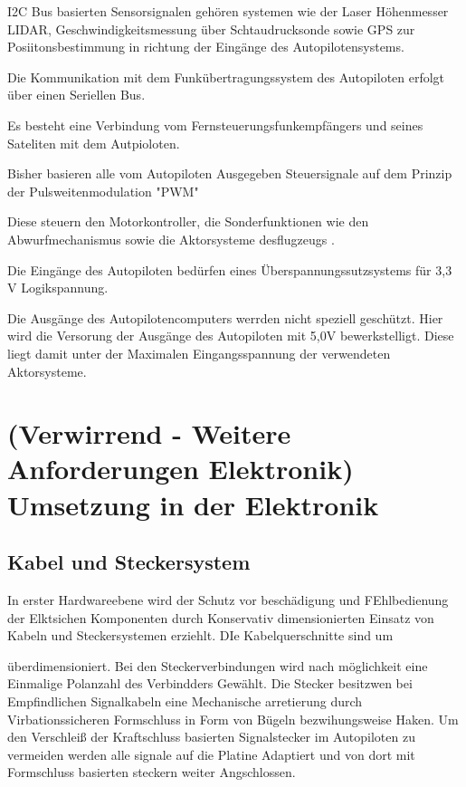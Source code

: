 I2C  Bus basierten Sensorsignalen gehören systemen wie der Laser Höhenmesser LIDAR, Geschwindigkeitsmessung über Schtaudrucksonde sowie GPS zur Posiitonsbestimmung in richtung der Eingänge des Autopilotensystems.

Die Kommunikation mit dem Funkübertragungssystem des Autopiloten erfolgt über einen Seriellen Bus.

Es besteht eine Verbindung vom Fernsteuerungsfunkempfängers und seines Sateliten mit dem Autpioloten.

Bisher basieren alle vom Autopiloten Ausgegeben Steuersignale auf dem Prinzip der Pulsweitenmodulation "PWM"

Diese steuern den Motorkontroller, die Sonderfunktionen wie den Abwurfmechanismus sowie die Aktorsysteme desflugzeugs .


Die Eingänge des Autopiloten bedürfen eines Überspannungssutzsystems für 3,3 V Logikspannung.

Die Ausgänge des Autopilotencomputers werrden nicht speziell geschützt. Hier wird die Versorung der Ausgänge des Autopiloten mit 5,0V bewerkstelligt. Diese liegt damit unter der  Maximalen Eingangsspannung der verwendeten Aktorsysteme.


\section{(Verwirrend - Weitere Anforderungen Elektronik) Umsetzung in der Elektronik}

\subsection{Kabel und Steckersystem}

In erster Hardwareebene  wird der Schutz vor beschädigung und FEhlbedienung der Elktsichen Komponenten durch Konservativ dimensionierten Einsatz von Kabeln und Steckersystemen erziehlt. DIe Kabelquerschnitte sind um
\begin{comment} Prozentzahl ?\end{comment}
überdimensioniert. Bei den Steckerverbindungen wird nach möglichkeit eine Einmalige Polanzahl des Verbindders Gewählt.
Die Stecker besitzwen bei Empfindlichen Signalkabeln eine Mechanische arretierung durch Virbationssicheren Formschluss in Form von Bügeln bezwihungsweise Haken.
Um den Verschleiß der Kraftschluss basierten Signalstecker im Autopiloten zu vermeiden werden alle signale auf die Platine Adaptiert und von dort mit Formschluss basierten steckern weiter  Angschlossen.

